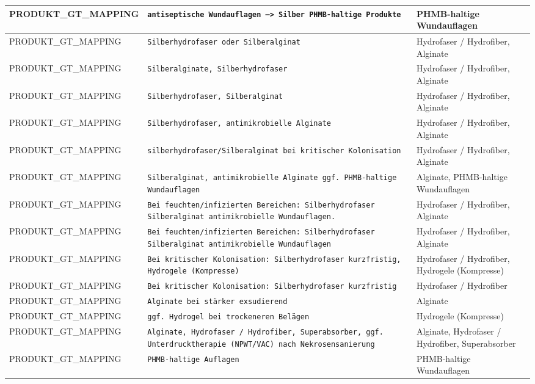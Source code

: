 \begin{longtable}{|p{3.5cm}|p{5cm}|p{6.5cm}|}
PRODUKT\_GT\_MAPPING & \texttt{antiseptische Wundauflagen --> Silber PHMB-haltige Produkte} & PHMB-haltige Wundauflagen \\ \hline
PRODUKT\_GT\_MAPPING & \texttt{Silberhydrofaser oder Silberalginat} & Hydrofaser / Hydrofiber, Alginate \\ \hline
PRODUKT\_GT\_MAPPING & \texttt{Silberalginate, Silberhydrofaser} & Hydrofaser / Hydrofiber, Alginate \\ \hline
PRODUKT\_GT\_MAPPING & \texttt{Silberhydrofaser, Silberalginat} & Hydrofaser / Hydrofiber, Alginate \\ \hline
PRODUKT\_GT\_MAPPING & \texttt{Silberhydrofaser, antimikrobielle Alginate} & Hydrofaser / Hydrofiber, Alginate \\ \hline
PRODUKT\_GT\_MAPPING & \texttt{silberhydrofaser/Silberalginat bei kritischer Kolonisation} & Hydrofaser / Hydrofiber, Alginate \\ \hline
PRODUKT\_GT\_MAPPING & \texttt{Silberalginat, antimikrobielle Alginate ggf. PHMB-haltige Wundauflagen} & Alginate, PHMB-haltige Wundauflagen \\ \hline
PRODUKT\_GT\_MAPPING & \texttt{Bei feuchten/infizierten Bereichen: Silberhydrofaser Silberalginat antimikrobielle Wundauflagen.} & Hydrofaser / Hydrofiber, Alginate \\ \hline
PRODUKT\_GT\_MAPPING & \texttt{Bei feuchten/infizierten Bereichen: Silberhydrofaser Silberalginat antimikrobielle Wundauflagen} & Hydrofaser / Hydrofiber, Alginate \\ \hline
PRODUKT\_GT\_MAPPING & \texttt{Bei kritischer Kolonisation: Silberhydrofaser kurzfristig, Hydrogele (Kompresse)} & Hydrofaser / Hydrofiber, Hydrogele (Kompresse) \\ \hline
PRODUKT\_GT\_MAPPING & \texttt{Bei kritischer Kolonisation: Silberhydrofaser kurzfristig} & Hydrofaser / Hydrofiber \\ \hline
PRODUKT\_GT\_MAPPING & \texttt{Alginate bei stärker exsudierend} & Alginate \\ \hline
PRODUKT\_GT\_MAPPING & \texttt{ggf. Hydrogel bei trockeneren Belägen} & Hydrogele (Kompresse) \\ \hline
PRODUKT\_GT\_MAPPING & \texttt{Alginate, Hydrofaser / Hydrofiber, Superabsorber, ggf. Unterdrucktherapie (NPWT/VAC) nach Nekrosensanierung} & Alginate, Hydrofaser / Hydrofiber, Superabsorber \\ \hline
PRODUKT\_GT\_MAPPING & \texttt{PHMB-haltige Auflagen} & PHMB-haltige Wundauflagen \\ \hline

\end{longtable}
